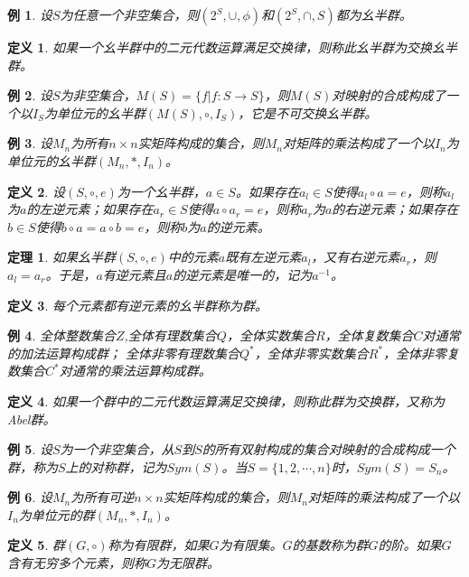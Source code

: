 \documentclass{article}
\newtheorem{Def}{定义}
\newtheorem{Thm}{定理}
\newtheorem*{Example}{例}
\begin{document}
\begin{CJK*}{UTF8}{gbsn}
\begin{Example}
  设$S$为任意一个非空集合，则$(2^S,\cup,\phi)$和$(2^S,\cap,S)$都为幺半群。
\end{Example}

\begin{Def}
  如果一个幺半群中的二元代数运算满足交换律，则称此幺半群为交换幺半群。
\end{Def}

\begin{Example}
  设$S$为非空集合，$M(S)=\{f|f:S\to S\}$，则$M(S)$对映射的合成构成了一个以$I_S$为单位元的幺半群$(M(S),\circ,I_S)$，它是不可交换幺半群。
\end{Example}
\begin{Example}
  设$M_n$为所有$n\times n$实矩阵构成的集合，则$M_n$对矩阵的乘法构成了一个以$I_n$为单位元的幺半群$(M_n,*,I_n)$。
\end{Example}


\begin{Def}
  设$(S,\circ,e)$为一个幺半群，$a\in S$。如果存在$a_l\in S$使得$a_l\circ a=e$，则称$a_l$为$a$的左逆元素；如果存在$a_r
  \in S$使得$a\circ a_r=e$，则称$a_r$为$a$的右逆元素；如果存在$b\in S$使得$b\circ a=a\circ b=e$，则称$b$为$a$的逆元素。
\end{Def}
\begin{Thm}
  如果幺半群$(S,\circ,e)$中的元素$a$既有左逆元素$a_l$，又有右逆元素$a_r$，则$a_l=a_r$。于是，$a$有逆元素且$a$的逆元素是唯一的，记为$a^{-1}$。
\end{Thm}
\begin{Def}
  每个元素都有逆元素的幺半群称为群。
\end{Def}
\begin{Example}
  全体整数集合$Z$,全体有理数集合$Q$，全体实数集合$R$，全体复数集合$C$对通常的加法运算构成群；
  全体非零有理数集合$Q^*$，全体非零实数集合$R^*$，全体非零复数集合$C^*$对通常的乘法运算构成群。
\end{Example}
\begin{Def}
  如果一个群中的二元代数运算满足交换律，则称此群为交换群，又称为Abel群。
\end{Def}
\begin{Example}
设$S$为一个非空集合，从$S$到$S$的所有双射构成的集合对映射的合成构成一个群，称为$S$上的对称群，记为$Sym(S)$。当$S=\{1,2,\cdots,n\}$时，$Sym(S)=S_n$。
\end{Example}
  \begin{Example}
    设$M_n$为所有可逆$n\times n$实矩阵构成的集合，则$M_n$对矩阵的乘法构成了一个以$I_n$为单位元的群$(M_n,*,I_n)$。
  \end{Example}
\begin{Def}
  群$(G,\circ)$称为有限群，如果$G$为有限集。$G$的基数称为群$G$的阶。如果$G$含有无穷多个元素，则称$G$为无限群。
\end{Def}


\end{CJK*}
\end{document}

